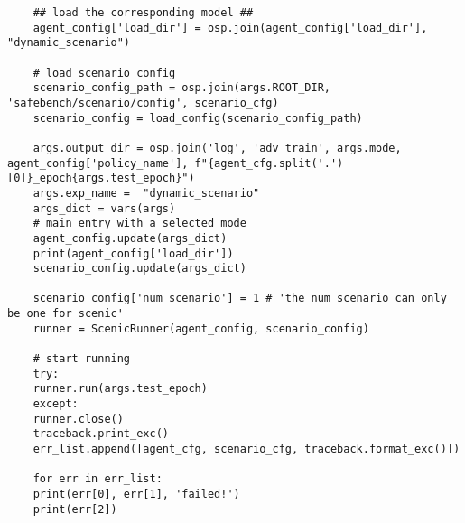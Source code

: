 \begin{enumerate}
\begin{verbatim}
	## load the corresponding model ##
	agent_config['load_dir'] = osp.join(agent_config['load_dir'], "dynamic_scenario")
	
	# load scenario config
	scenario_config_path = osp.join(args.ROOT_DIR, 'safebench/scenario/config', scenario_cfg)
	scenario_config = load_config(scenario_config_path)
	
	args.output_dir = osp.join('log', 'adv_train', args.mode, agent_config['policy_name'], f"{agent_cfg.split('.')[0]}_epoch{args.test_epoch}")
	args.exp_name =  "dynamic_scenario"
	args_dict = vars(args)
	# main entry with a selected mode
	agent_config.update(args_dict)
	print(agent_config['load_dir'])
	scenario_config.update(args_dict)
	
	scenario_config['num_scenario'] = 1 # 'the num_scenario can only be one for scenic'
	runner = ScenicRunner(agent_config, scenario_config)
	
	# start running
	try:
	runner.run(args.test_epoch)
	except:
	runner.close()
	traceback.print_exc()
	err_list.append([agent_cfg, scenario_cfg, traceback.format_exc()])
	
	for err in err_list:
	print(err[0], err[1], 'failed!')
	print(err[2])
	
	\end{verbatim}
\end{enumerate}